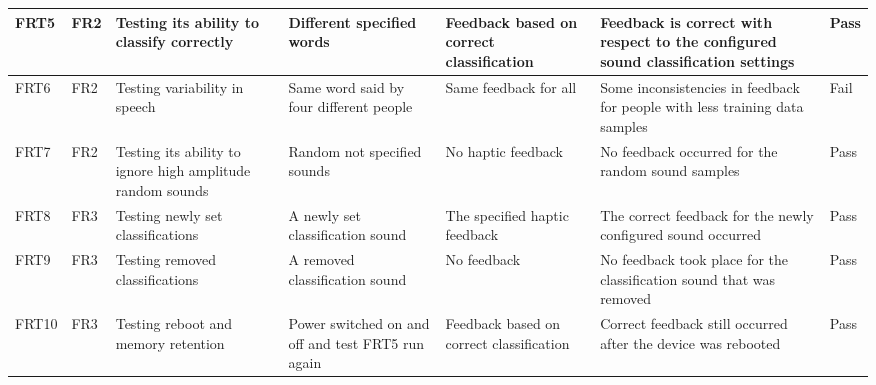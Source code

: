 \documentclass[12pt, titlepage]{article}
\begin{document}
\begin{longtable}{|p{1.2cm}|p{0.9cm}|p{2.5cm}|p{1.5cm}|p{2.5cm}|p{2cm}|p{1.2cm}|}
  FRT5        & FR2          & Testing its ability to classify correctly                                    & Different specified words                         & Feedback based on correct classification                    &          Feedback is correct with respect to the configured sound classification settings              &                    {\color[HTML]{32CB00} Pass}                               \\ \hline
  FRT6        & FR2          & Testing variability in speech                                                & Same word said by four different people           & Same feedback for all                                       &          Some inconsistencies in feedback for people with less training data samples               &            {\color[HTML]{FE0000} Fail}                                        \\ \hline
  FRT7        & FR2          & Testing its ability to ignore high amplitude random sounds                   & Random not specified sounds                       & No haptic feedback                                          &          No feedback occurred for the random sound samples              &                     {\color[HTML]{32CB00} Pass}                               \\ \hline
  FRT8        & FR3          & Testing newly set classifications                                            & A newly set classification sound                  & The specified haptic feedback                               &          The correct feedback for the newly configured sound occurred              &                  {\color[HTML]{32CB00} Pass}                                  \\ \hline
  FRT9        & FR3          & Testing removed classifications                                              & A removed classification sound                    & No feedback                                                 &          No feedback took place for the classification sound that was removed              &            {\color[HTML]{32CB00} Pass}                                        \\ \hline
  FRT10       & FR3          & Testing reboot and memory retention                                          & Power switched on and off and test FRT5 run again & Feedback based on correct classification                    &          Correct feedback still occurred after the device was rebooted              &               {\color[HTML]{32CB00} Pass}                                     \\ \hline

\end{longtable}
\end{document}
